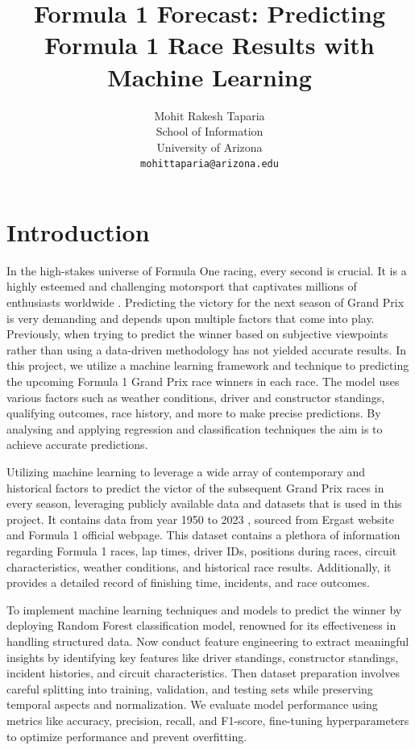 \documentclass[11pt,article,oneside]{article}
\title{Formula 1 Forecast: Predicting Formula 1 Race Results with Machine Learning}
\author{%
    Mohit Rakesh Taparia\\
    School of Information \\
    University of Arizona\\
    \texttt{mohittaparia@arizona.edu}
}
\begin{document}
\maketitle

\section{Introduction}
In the high-stakes universe of Formula One racing, every second is crucial. It is a highly esteemed and challenging motorsport that captivates millions of enthusiasts worldwide \citep{ref1}. Predicting the victory for the next season of Grand Prix is very demanding and depends upon multiple factors that come into play. Previously, when trying to predict the winner based on subjective viewpoints rather than using a data-driven methodology has not yielded accurate results. In this project, we utilize a machine learning framework and technique to predicting the upcoming Formula 1 Grand Prix race winners in each race. The model uses various factors such as weather conditions, driver and constructor standings, qualifying outcomes, race history, and more to make precise predictions. By analysing and applying regression and classification techniques the aim is to achieve accurate predictions.

Utilizing machine learning to leverage a wide array of contemporary and historical factors to predict the victor of the subsequent Grand Prix races in every season, leveraging publicly available data and datasets that is used in this project. It contains data from year 1950 to 2023 \citep{ref3}, sourced from Ergast website and Formula 1 official webpage. This dataset contains a plethora of information regarding Formula 1 races, lap times, driver IDs, positions during races, circuit characteristics, weather conditions, and historical race results. Additionally, it provides a detailed record of finishing time, incidents, and race outcomes.

To implement machine learning techniques and models to predict the winner by deploying Random Forest classification model, renowned for its effectiveness in handling structured data. Now conduct feature engineering to extract meaningful insights by identifying key features like driver standings, constructor standings, incident histories, and circuit characteristics. Then dataset preparation involves careful splitting into training, validation, and testing sets while preserving temporal aspects and normalization. We evaluate model performance using metrics like accuracy, precision, recall, and F1-score, fine-tuning hyperparameters to optimize performance and prevent overfitting\citep{ref2}.
\end{document}
